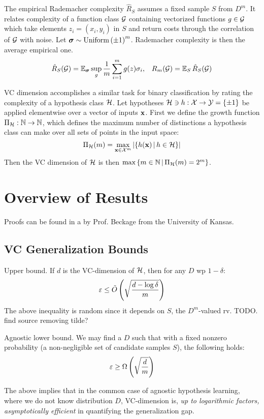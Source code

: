 \documentclass{article}
\begin{document}
The empirical Rademacher complexity $\hat{R}_S$ assumes a fixed sample $S$ from $D^m$. It relates complexity of a function class $\mathcal{G}$ containing vectorized functions $g\in \mathcal{G}$ which take elements $z_i=(x_i, y_i)$ in $S$ and return costs through the correlation of $\mathcal{G}$ with noise. Let ${\boldsymbol\sigma}\sim \operatorname{Uniform}\left({\pm 1}\right)^m$. Rademacher complexity is then the average empirical one.
$$
\hat{R}_S(\mathcal{G})=\operatorname{\mathbb{E}}_{\boldsymbol\sigma} \sup_g \frac{1}{m}\sum_{i=1}^m{g(z) \sigma_i},\;\;\; R_m(\mathcal{G})=\operatorname{\mathbb{E}}_S\hat{R}_S(\mathcal{G})
$$

VC dimension accomplishes a similar task for binary classification by rating the complexity of a hypothesis class $\mathcal{H}$. Let hypotheses $\mathcal{H}\ni h:\mathcal{X}\rightarrow \mathcal{Y}=\left\{{\pm 1}\right\}$ be applied elementwise over a vector of inputs $\textbf{x}$. First we define the growth function $\Pi_{\mathcal{H}}:\mathbb{N}\rightarrow\mathbb{N}$, which defines the maximum number of distinctions a hypothesis class can make over all sets of points in the input space:
$$
\Pi_{\mathcal{H}}(m)=\max_{\textbf{x}\in\mathcal{X}^m}\left\vert{ \left\{ h(\textbf{x}) \,\middle|\, h\in\mathcal{H}\right\} }\right\vert
$$
Then the VC dimension of $\mathcal{H}$ is then $\max\left\{ m\in\mathbb{N} \,\middle|\, \Pi_{\mathcal{H}}(m)=2^m \right\}$.

\section{Overview of Results}

Proofs can be found in a  by Prof. Beckage from the University of Kansas.

\subsection{VC Generalization Bounds}

Upper bound. If $d$ is the VC-dimension of $\mathcal{H}$, then for any $D$ wp $1-\delta$:
$$
\varepsilon\le \tilde{O}\left({\sqrt{\frac{d-\log \delta}{m}}}\right)
$$
The above inequality is random since it depends on $S$, the $D^m$-valued rv. TODO. find source removing tilde?

Agnostic lower bound. We may find a $D$ such that with a fixed nonzero probability (a non-negligible set of candidate samples $S$), the following holds:
$$
\varepsilon\ge \Omega\left({\sqrt{\frac{d}{m}}}\right)
$$

The above implies that in the common case of agnostic hypothesis learning, where we do not know distribution $D$, VC-dimension is, \textit{up to logarithmic factors, asymptotically efficient} in quantifying the generalization gap.
\end{document}
